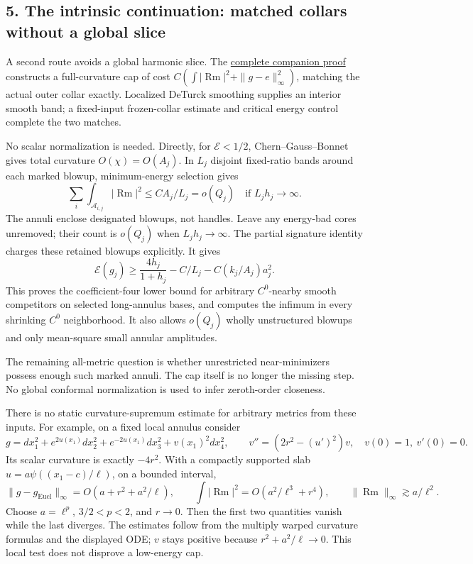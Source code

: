 \documentclass[
  10pt,
]{article}
\begin{document}
\hypertarget{the-intrinsic-continuation-matched-collars-without-a-global-slice}{%
\subsection{5. The intrinsic continuation: matched collars without a
global
slice}\label{the-intrinsic-continuation-matched-collars-without-a-global-slice}}

A second route avoids a global harmonic slice. The
\href{20260928_intrinsic_caps_and_stability.md}{complete companion
proof} constructs a full-curvature cap of cost
\(C(\int|\operatorname{Rm}|^2+\|g-e\|_\infty^2)\), matching the actual
outer collar exactly. Localized DeTurck smoothing supplies an interior
smooth band; a fixed-input frozen-collar estimate and critical energy
control complete the two matches.

No scalar normalization is needed. Directly, for \(\mathcal E<1/2\),
Chern--Gauss--Bonnet gives total curvature \(O(\chi)=O(A_j)\). In
\(L_j\) disjoint fixed-ratio bands around each marked blowup,
minimum-energy selection gives \[
 \sum_i\int_{\mathcal A_{i,j}}|\operatorname{Rm}|^2
        \le C A_j/L_j=o(Q_j)\quad\text{if }L_jh_j\to\infty.
                                                               \tag{5.1}
\] The annuli enclose designated blowups, not handles. Leave any
energy-bad cores unremoved; their count is \(o(Q_j)\) when
\(L_jh_j\to\infty\). The partial signature identity charges these
retained blowups explicitly. It gives \[
 \mathcal E(g_j)\ge\frac{4h_j}{1+h_j}
                      -C/L_j-C(k_j/A_j)a_j^2.        \tag{5.1a}
\] This proves the coefficient-four lower bound for arbitrary
\(C^0\)-nearby smooth competitors on selected long-annulus bases, and
computes the infimum in every shrinking \(C^0\) neighborhood. It also
allows \(o(Q_j)\) wholly unstructured blowups and only mean-square small
annular amplitudes.

The remaining all-metric question is whether unrestricted
near-minimizers possess enough such marked annuli. The cap itself is no
longer the missing step. No global conformal normalization is used to
infer zeroth-order closeness.

There is no static curvature-supremum estimate for arbitrary metrics
from these inputs. For example, on a fixed local annulus consider \[
 g=dx_1^2+e^{2u(x_1)}dx_2^2+e^{-2u(x_1)}dx_3^2
                  +v(x_1)^2dx_4^2,\qquad
 v''=(2r^2-(u')^2)v,\quad v(0)=1,\ v'(0)=0.
\] Its scalar curvature is exactly \(-4r^2\). With a compactly supported
slab \(u=a\psi((x_1-c)/\ell)\), on a bounded interval, \[
 \|g-g_{\mathrm{Eucl}}\|_\infty
       =O(a+r^2+a^2/\ell),\qquad
 \int|\operatorname{Rm}|^2=O(a^2/\ell^3+r^4),\qquad
 \|\operatorname{Rm}\|_\infty\gtrsim a/\ell^2 .
                                                               \tag{5.2}
\] Choose \(a=\ell^p\), \(3/2<p<2\), and \(r\to0\). Then the first two
quantities vanish while the last diverges. The estimates follow from the
multiply warped curvature formulas and the displayed ODE; \(v\) stays
positive because \(r^2+a^2/\ell\to0\). This local test does not disprove
a low-energy cap.
\end{document}
